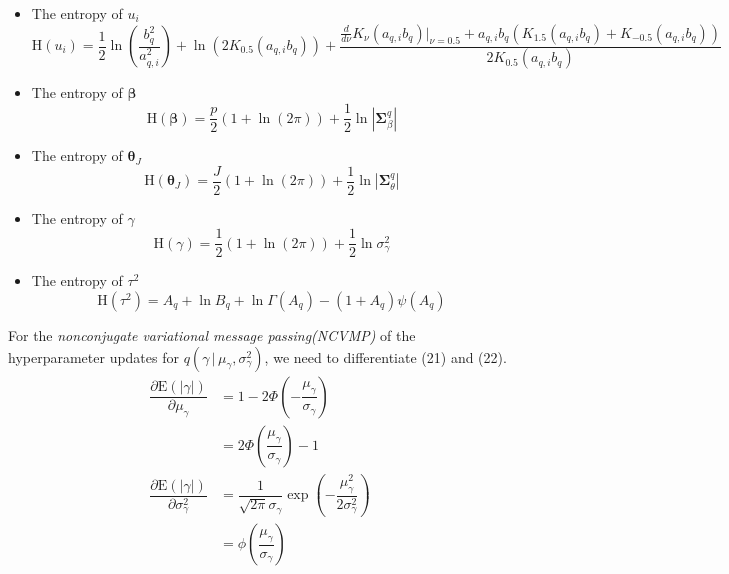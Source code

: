 \documentclass[12pt]{article}
\newcommand{\bs}{\boldsymbol}
\begin{document}
  \begin{itemize}
    \item The entropy of $u_{i}$
    \begin{equation}
      \mathrm{H}\left(u_{i}\right) = \dfrac{1}{2}\ln\left(\dfrac{b_{q}^{2}}{a_{q,i}^{2}}\right)+\ln\left(2K_{0.5}\left(a_{q,i}b_{q}\right)\right)+\dfrac{\frac{d}{d\nu}K_{\nu}\left(a_{q,i}b_{q}\right)\Big|_{\nu=0.5}+a_{q,i}b_{q}\left(K_{1.5}\left(a_{q,i}b_{q}\right)+K_{-0.5}\left(a_{q,i}b_{q}\right)\right)}{2K_{0.5}\left(a_{q,i}b_{q}\right)}
    \end{equation}
    \item The entropy of $\bs{\beta}$
    \begin{equation}
      \mathrm{H}\left(\bs{\beta}\right) = \dfrac{p}{2}\left(1+\ln\left(2\pi\right)\right)+\dfrac{1}{2}\ln\left|\bs{\Sigma}_{\beta}^{q}\right|
    \end{equation}
    \item The entropy of $\bs{\theta}_{J}$
    \begin{equation}
      \mathrm{H}\left(\bs{\theta}_{J}\right) = \dfrac{J}{2}\left(1+\ln\left(2\pi\right)\right)+\dfrac{1}{2}\ln\left|\bs{\Sigma}_{\theta}^{q}\right|
    \end{equation}
    \item The entropy of $\gamma$
    \begin{equation}
      \mathrm{H}\left(\gamma\right) = \dfrac{1}{2}\left(1+\ln\left(2\pi\right)\right)+\dfrac{1}{2}\ln\sigma_{\gamma}^{2}
    \end{equation}
    \item The entropy of $\tau^{2}$
    \begin{equation}
      \mathrm{H}\left(\tau^{2}\right) = A_{q}+\ln B_{q}+\ln\Gamma\left(A_{q}\right)-\left(1+A_{q}\right)\psi\left(A_{q}\right)
    \end{equation}
  \end{itemize}
  For the \emph{nonconjugate variational message passing(NCVMP)} of the hyperparameter updates for $q\left(\gamma\,|\,\mu_{\gamma},\sigma_{\gamma}^{2}\right)$, we need to differentiate (21) and (22).
  \begin{align}
    \dfrac{\partial \mathrm{E}\left(\left|\gamma\right|\right)}{\partial \mu_{\gamma}} &= 1-2\Phi\left(-\dfrac{\mu_{\gamma}}{\sigma_{\gamma}}\right)\\
    &= 2\Phi\left(\dfrac{\mu_{\gamma}}{\sigma_{\gamma}}\right)-1\\
    \dfrac{\partial \mathrm{E}\left(\left|\gamma\right|\right)}{\partial \sigma_{\gamma}^{2}} &= \dfrac{1}{\sqrt{2\pi}\sigma_{\gamma}}\exp\left(-\dfrac{\mu_{\gamma}^{2}}{2\sigma_{\gamma}^{2}}\right)\\
    &= \phi\left(\dfrac{\mu_{\gamma}}{\sigma_{\gamma}}\right)
  \end{align}
\end{document}

